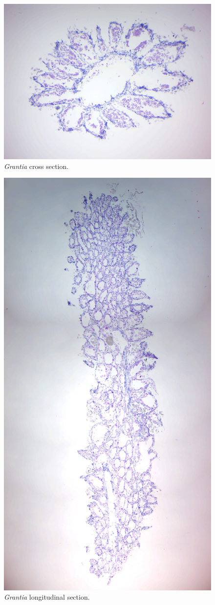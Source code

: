 \begin{figure}

{\centering \includegraphics[width=0.7\linewidth]{./figures/porifera/grantia_xs}

}

\caption{\emph{Grantia} cross section.}\label{fig:grantiaxs}
\end{figure}

\begin{figure}

{\centering \includegraphics[width=0.7\linewidth]{./figures/porifera/grantia_ls}

}

\caption{\emph{Grantia} longitudinal section.}\label{fig:grantials}
\end{figure}

